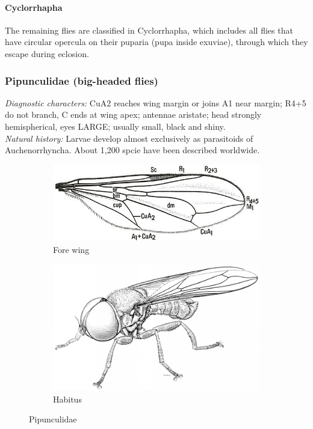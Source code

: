\documentclass[letterpaper, 11pt]{article}
\begin{document}
\paragraph{Cyclorrhapha} The remaining flies are classified in Cyclorrhapha, which includes all flies that have circular opercula on their puparia (pupa inside exuviae), through which they escape during eclosion.

\subsubsection{Pipunculidae (big-headed flies)}
\noindent{}\textit{Diagnostic characters:} CuA2 reaches wing margin or joins A1 near margin; R4+5 do not branch, C ends at wing apex; antennae aristate; head strongly hemispherical, eyes LARGE; usually small, black and shiny.\\

\noindent{}\textit{Natural history:} Larvae develop almost exclusively as parasitoids of Auchenorrhyncha. About 1,200 spcie have been described worldwide.

\begin{figure}[ht!]
    \centering
    \begin{subfigure}[ht!]{0.45\textwidth}
        \includegraphics[width=\textwidth]{PipunculidWing}
        \caption{Fore wing \citep[][Fig. 4.50]{mcalpine1981manual}}
        \label{fig:pipunculid1}
    \end{subfigure}
    \qquad
    \begin{subfigure}[ht!]{0.42\textwidth}
        \includegraphics[width=\textwidth]{PipunculidHabitus}
        \caption{Habitus \citep[][Fig. 53.1]{mcalpine1981manualv2}}
        \label{fig:pipunculid2}
    \end{subfigure}
    \caption{Pipunculidae}\label{fig:pipunculids}
\end{figure}
\end{document}
